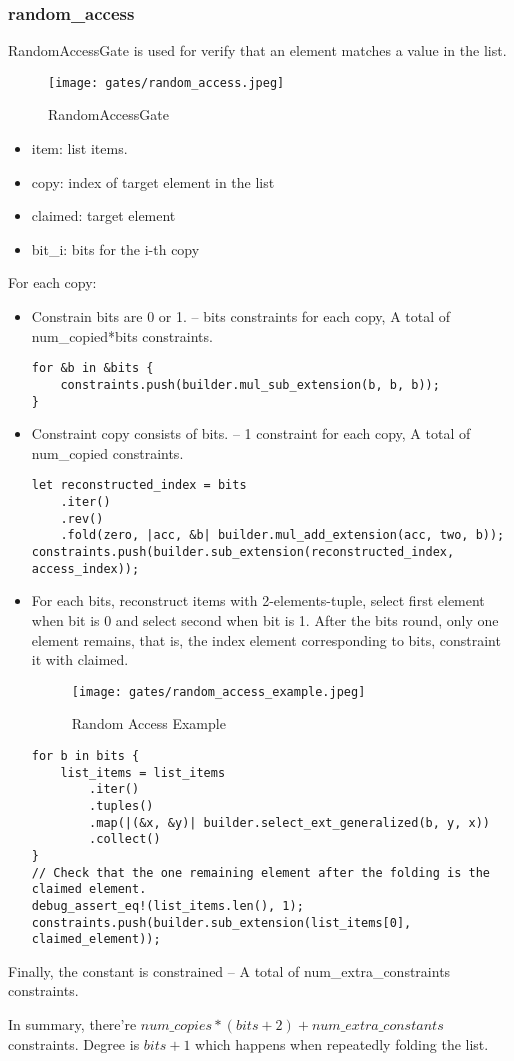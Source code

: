 \subsubsection{random\_access}

RandomAccessGate is used for verify that an element matches a value in the list.

\begin{figure}[!ht]
    \centering
    \texttt{[image: gates/random\_access.jpeg]}
    \caption{RandomAccessGate}
    \label{fig:random-access}
\end{figure}

\begin{itemize}
    \item item: list items.
    \item copy: index of target element in the list
    \item claimed: target element
    \item bit\_i: bits for the i-th copy
\end{itemize}

For each copy:
\begin{itemize}
    \item Constrain bits are 0 or 1. -- bits constraints for each copy, A total of num\_copied*bits constraints.
    \begin{lstlisting}
for &b in &bits {
    constraints.push(builder.mul_sub_extension(b, b, b));
}
    \end{lstlisting}
    \item Constraint copy consists of bits. -- 1 constraint for each copy, A total of num\_copied constraints.
    \begin{lstlisting}
let reconstructed_index = bits
    .iter()
    .rev()
    .fold(zero, |acc, &b| builder.mul_add_extension(acc, two, b));
constraints.push(builder.sub_extension(reconstructed_index, access_index));
    \end{lstlisting}
    \item For each bits, reconstruct items with 2-elements-tuple, select first element when bit is 0 and select second when bit is 1.
    After the bits round, only one element remains, that is, the index element corresponding to bits, constraint it with claimed.
    \begin{figure}[!ht]
        \centering
        \texttt{[image: gates/random\_access\_example.jpeg]}
        \caption{Random Access Example}
        \label{fig:random-access-example}
    \end{figure}
    \begin{lstlisting}
for b in bits {
    list_items = list_items
        .iter()
        .tuples()
        .map(|(&x, &y)| builder.select_ext_generalized(b, y, x))
        .collect()
}
// Check that the one remaining element after the folding is the claimed element.
debug_assert_eq!(list_items.len(), 1);
constraints.push(builder.sub_extension(list_items[0], claimed_element));
    \end{lstlisting}
\end{itemize}

Finally, the constant is constrained -- A total of num\_extra\_constraints constraints.

In summary, there're $num\_copies*(bits + 2) + num\_extra\_constants$ constraints. Degree is $bits + 1$ which happens when repeatedly folding the list. 
